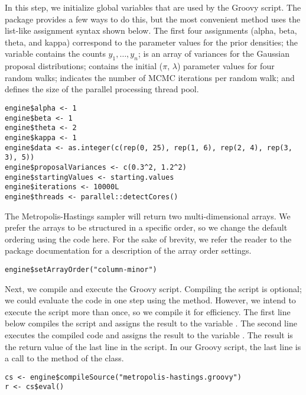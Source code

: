 In this step, we initialize global variables that are used by the Groovy script. The  package provides a few ways to do this, but the most convenient method uses the list-like assignment syntax shown below. The first four assignments (alpha, beta, theta, and kappa) correspond to the parameter values for the prior densities; the variable  contains the counts $y_1,\dots,y_n$;  is an array of variances for the Gaussian proposal distributions;  contains the initial ($\pi$, $\lambda$) parameter values for four random walks;  indicates the number of MCMC iterations per random walk; and  defines the size of the parallel processing thread pool.

\begin{verbatim}
engine$alpha <- 1
engine$beta <- 1
engine$theta <- 2
engine$kappa <- 1
engine$data <- as.integer(c(rep(0, 25), rep(1, 6), rep(2, 4), rep(3, 3), 5))
engine$proposalVariances <- c(0.3^2, 1.2^2)
engine$startingValues <- starting.values
engine$iterations <- 10000L
engine$threads <- parallel::detectCores()
\end{verbatim}

The Metropolis-Hastings sampler will return two multi-dimensional arrays. We prefer the arrays to be structured in a specific order, so we change the default ordering using the code here. For the sake of brevity, we refer the reader to the package documentation for a description of the array order settings.

\begin{verbatim}
engine$setArrayOrder("column-minor")
\end{verbatim}

Next, we compile and execute the Groovy script. Compiling the script is optional; we could evaluate the code in one step using the   method. However, we intend to execute the script more than once, so we compile it for efficiency. The first line below compiles the script and assigns the result to the variable . The second line executes the compiled code and assigns the result to the variable . The result is the return value of the last line in the script. In our Groovy script, the last line is a call to the method  of the  class.

\begin{verbatim}
cs <- engine$compileSource("metropolis-hastings.groovy")
r <- cs$eval()
\end{verbatim}

